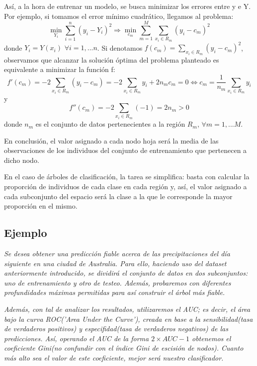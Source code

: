 \documentclass[12pt,twoside]{article}
\begin{document}
Así, a la hora de entrenar un modelo, se busca minimizar los errores entre y e Y. Por ejemplo, si tomamos el error mínimo cuadrático, llegamos al problema:
\begin{equation*}
\min_{Y_i} \sum_{i=1}^n (y_i - Y_i)^2 \Rightarrow \min_{c_m} \sum_{m = 1}^M \sum_{x_i \in R_m} (y_i - c_m)^2
\end{equation*}
donde $Y_i = Y(x_i) \, \, \forall i=1,...n$. Si denotamos $f(c_m) = \sum_{x_i \in R_m} (y_i - c_m)^2$, observamos que alcanzar la solución óptima del problema planteado es equivalente a minimizar la función f:
\begin{equation*}
f'(c_m) = -2 \sum_{x_i \in R_m} (y_i - c_m) = -2 \sum_{x_i \in R_m}y_i + 2n_mc_m = 0 \Leftrightarrow c_m = \frac{1}{n_m} \sum_{x_i \in R_m}y_i
\end{equation*}
y
\begin{equation*}
f''(c_m) = -2 \sum_{x_i \in R_m} (-1) = 2n_m > 0
\end{equation*}
donde $n_m$ es el conjunto de datos pertenecientes a la región $R_m$, $\forall m = 1,...M$.

En conclusión, el valor asignado a cada nodo hoja será la media de las observaciones de los individuos del conjunto de entrenamiento que pertenecen a dicho nodo.

En el caso de árboles de clasificación, la tarea se simplifica: basta con calcular la proporción de individuos de cada clase en cada región y, así, el valor asignado a cada subconjunto del espacio será la clase a la que le corresponde la mayor proporción en el mismo.


\subsection{Ejemplo}
\textit{Se desea obtener una predicción fiable acerca de las precipitaciones del día siguiente en una ciudad de Australia. Para ello, haciendo uso del dataset anteriormente introducido, se dividirá el conjunto de datos en dos subconjuntos: uno de entrenamiento y otro de testeo. Además, probaremos con diferentes profundidades máximas permitidas para así construir el árbol más fiable.}

\textit{Además, con tal de analizar los resultados, utilizaremos el AUC; es decir, el área bajo la curva ROC('Area Under the Curve'), creada en base a la sensibilidad(tasa de  verdaderos positivos) y especifidad(tasa de verdaderos negativos) de las predicciones. Así, operando el AUC de la forma $2 \times AUC - 1$ obtenemos el coeficiente Gini(no confundir con el índice Gini de escisión de nodos). Cuanto más alto sea el valor de este coeficiente, mejor será nuestro clasificador.}
\end{document}

